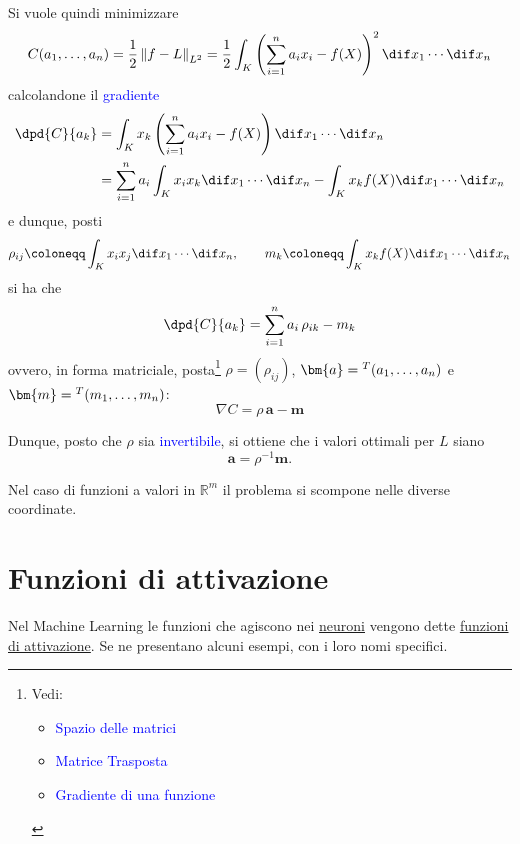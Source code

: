 \documentclass[10pt]{book}
\newcommand{\1}{\mathds{1}}
\newcommand{\R}{\mathds{R}}
\newcommand{\norma}[1]{%
\left\lVert#1\right\rVert%
}
\theoremstyle{definition}%
\theoremstyle{plain}
\theoremstyle{remark}
\renewcommand{\href}[2]{\textcolor{blue}{#2}}
\begin{document}
Si vuole quindi minimizzare
\begin{equation*}
C(a_{1},\dots,a_{n}) = \frac{1}{2}\norma{f-L}_{L^{2}} = \frac{1}{2}\int_{K} \left(\sum_{i=1}^{n} a_{i}x_{i} - f(X)\right)^{2}\dif x_{1}\cdots\dif x_{n}
\end{equation*}
calcolandone il \href{../../../../../org/roam/20250624171244-gradiente_di_una_funzione.org}{gradiente}
\begin{align*}
\dpd{C}{a_{k}} &= \int_{K} x_{k} \left(\sum_{i=1}^{n} a_{i}x_{i} - f(X)\right)\dif x_{1}\cdots\dif x_{n}\\
&= \sum_{i=1}^{n} a_{i} \int_{K} x_{i} x_{k}\dif x_{1}\cdots\dif x_{n} - \int_{K} x_{k} f(X)\dif x_{1}\cdots\dif x_{n}
\end{align*}
e dunque, posti
\begin{equation*}
\rho_{ij} \coloneqq \int_{K} x_{i}x_{j}\dif x_{1}\cdots\dif x_{n},\qquad m_{k} \coloneqq \int_{K} x_{k}f(X)\dif x_{1}\cdots\dif x_{n}
\end{equation*}
si ha che
\begin{equation*}
\dpd{C}{a_{k}} = \sum_{i=1}^{n}a_{i}\,\rho_{ik} - m_{k}
\end{equation*}
ovvero, in forma matriciale, posta\footnote{Vedi:
\begin{itemize}
\item \href{../../../../../org/roam/20250104111539-spazio_delle_matrici.org}{Spazio delle matrici}
\item \href{../../../../../org/roam/20250113144338-matrice_trasposta.org}{Matrice Trasposta}
\item \href{../../../../../org/roam/20250624171244-gradiente_di_una_funzione.org}{Gradiente di una funzione}
\end{itemize}} \(\rho=(\rho_{ij})\), \(\bm{a} = \null^{T}(a_{1},\dots,a_{n})\) e \(\bm{m} = \null^{T}(m_{1},\dots,m_{n})\):
\begin{equation*}
\nabla C = \rho\, \bm{a} - \bm{m}
\end{equation*}

Dunque, posto che \(\rho\) sia \href{../../../../../org/roam/20250104111735-matrice_invertibile.org}{invertibile}, si ottiene che i valori ottimali per \(L\) siano
\begin{equation*}
\bm{a} = \rho^{-1}\bm{m}.
\end{equation*}

Nel caso di funzioni a valori in \(\R^{m}\) il problema si scompone nelle diverse coordinate.
\section{Funzioni di attivazione}
\label{sec:org21c5504}
Nel Machine Learning le funzioni che agiscono nei \hyperref[sec:org652f4d6]{neuroni} vengono dette \uline{funzioni di attivazione}. Se ne presentano alcuni esempi, con i loro nomi specifici.
\end{document}

